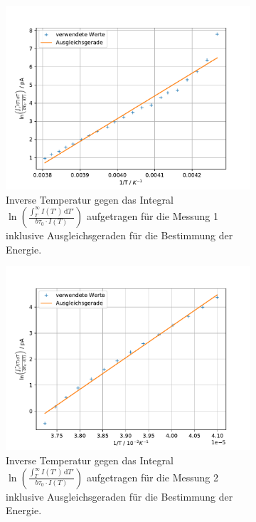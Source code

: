 \begin{figure}
  
  \centering
  \begin{subfigure}[b]{0.75\textwidth}
      \centering
      \includegraphics[width=\textwidth]{build_j/log(int)_2durchT_1.pdf}
      \caption{Inverse Temperatur gegen das Integral $\ln\left( \frac{\int_T^\infty I(T') \, \text{d}T'}{b \tau_0 \cdot I(T)}\right)$ aufgetragen für die Messung 1 inklusive Ausgleichsgeraden für die Bestimmung der Energie.}
  \end{subfigure}
  \hfill
  \begin{subfigure}[b]{0.75\textwidth}
      \centering
      \includegraphics[width=\textwidth]{build_j/log(int)_2durchT_2.pdf}
      \caption{Inverse Temperatur gegen das Integral $\ln\left( \frac{\int_T^\infty I(T') \, \text{d}T'}{b \tau_0 \cdot I(T)}\right)$ aufgetragen für die Messung 2 inklusive Ausgleichsgeraden für die Bestimmung der Energie.}
  \end{subfigure}
  \caption{}
  \label{fig:int}
\end{figure}

